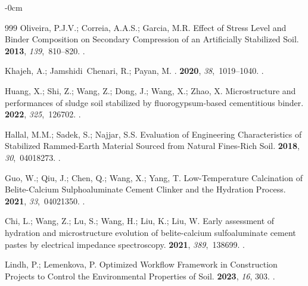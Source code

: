 \documentclass[sustainability,article,accept,pdftex,moreauthors]{Definitions/mdpi}
\begin{document}
{{\begin{adjustwidth}{-\extralength}{0cm}
\begin{thebibliography}{999}
Oliveira, P.J.V.; Correia, A.A.S.; Garcia, M.R.
\newblock Effect of Stress Level and Binder Composition on Secondary
  Compression of an Artificially Stabilized Soil.
 {\bf
  2013}, {\em 139},~810--820.
.

Khajeh, A.; Jamshidi~Chenari, R.; Payan, M.
.
 {\bf 2020}, {\em
  38},~1019--1040.
.

Huang, X.; Shi, Z.; Wang, Z.; Dong, J.; Wang, X.; Zhao, X.
\newblock Microstructure and performances of sludge soil stabilized by
  fluorogypsum-based cementitious binder.
 {\bf 2022}, {\em
  325},~126702.
.

Hallal, M.M.; Sadek, S.; Najjar, S.S.
\newblock Evaluation of Engineering Characteristics of Stabilized Rammed-Earth
  Material Sourced from Natural Fines-Rich Soil.
 {\bf 2018}, {\em
  30},~04018273.
.

Guo, W.; Qiu, J.; Chen, Q.; Wang, X.; Yang, T.
\newblock Low-Temperature Calcination of Belite-Calcium Sulphoaluminate Cement
  Clinker and the Hydration Process.
 {\bf 2021}, {\em
  33},~04021350.
.

Chi, L.; Wang, Z.; Lu, S.; Wang, H.; Liu, K.; Liu, W.
\newblock Early assessment of hydration and microstructure evolution of
  belite-calcium sulfoaluminate cement pastes by electrical impedance
  spectroscopy.
 {\bf 2021}, {\em 389},~138699.
.

Lindh, P.; Lemenkova, P.
\newblock Optimized Workflow Framework in Construction Projects to Control the
  Environmental Properties of Soil.
 {\bf 2023}, {\em 16}, {303.}
.


\end{thebibliography}
\end{adjustwidth}}}
\end{document}
